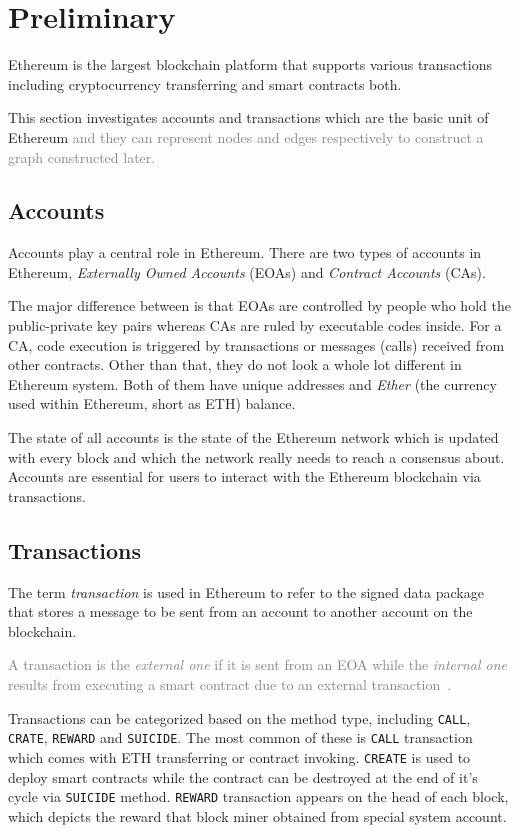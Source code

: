 
\section{Preliminary}
\label{sec:preliminary}
Ethereum is the largest blockchain platform that supports various transactions including cryptocurrency transferring and smart contracts both. 

This section investigates accounts and transactions which are the basic unit of Ethereum \textcolor{gray}{and they can represent nodes and edges respectively to construct a graph constructed later.} 

\subsection{Accounts}
Accounts play a central role in Ethereum. There are two types of accounts in Ethereum, \emph{Externally Owned Accounts} (EOAs) and \emph{Contract Accounts} (CAs). 

The major difference between is that EOAs are controlled by people who hold the public-private key pairs whereas CAs are ruled by executable codes inside. For a CA, code execution is triggered by transactions or messages (calls) received from other contracts. Other than that, they do not look a whole lot different in Ethereum system. Both of them have unique addresses and \emph{Ether} (the currency used within Ethereum, short as ETH) balance.

The state of all accounts is the state of the Ethereum network which is updated with every block and which the network really needs to reach a consensus about. Accounts are essential for users to interact with the Ethereum blockchain via transactions.
 
 \subsection{Transactions}
 The term \emph{transaction} is used in Ethereum to refer to the signed data package that stores a message to be sent from an account to another account on the blockchain.
 
\textcolor{gray}{A transaction is the \emph{external one} if it is sent from an EOA while the \emph{internal one} results from executing a smart contract due to an external transaction~\cite{chen2018infocom}.}

Transactions can be categorized based on the method type, including \texttt{CALL}, \texttt{CRATE}, \texttt{REWARD} and \texttt{SUICIDE}. The most common of these is \texttt{CALL} transaction which comes with ETH transferring or contract invoking. \texttt{CREATE} is used to deploy smart contracts while the contract can be destroyed at the end of it's cycle via \texttt{SUICIDE} method. \texttt{REWARD} transaction appears on the head of each block, which depicts the reward that block miner obtained from special system account.

